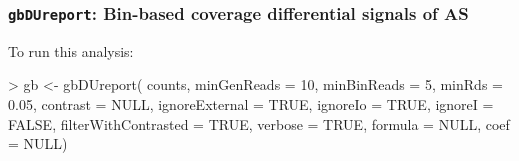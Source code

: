 \documentclass{article}
\begin{document}
\subsubsection{\texttt{gbDUreport}: Bin-based coverage differential signals of AS}  \label{sec:du}

To run this analysis:

\begin{Schunk}
\begin{Sinput}
>  gb <- gbDUreport( counts, 
              minGenReads = 10, 
              minBinReads = 5,
              minRds = 0.05, 
              contrast = NULL, 
              ignoreExternal = TRUE, 
              ignoreIo = TRUE, 
              ignoreI = FALSE,
              filterWithContrasted = TRUE,
              verbose = TRUE,
              formula = NULL,
              coef = NULL)
\end{Sinput}
\end{Schunk}
\end{document}

